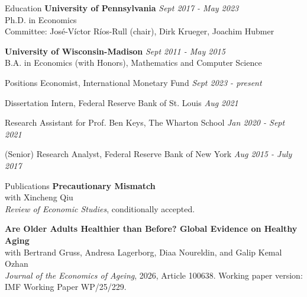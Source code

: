 \documentclass{resume}
\begin{document}
\begin{rSection}{Education}
{\bf University of Pennsylvania} \hfill {\em Sept 2017 - May 2023}
\\Ph.D. in Economics
\\Committee: Jos\'e-V\'ictor R\'ios-Rull (chair), Dirk Krueger, Joachim Hubmer

{\bf University of Wisconsin-Madison} \hfill {\em Sept 2011 - May 2015}
\\B.A. in Economics (with Honors), Mathematics and Computer Science %

\end{rSection}


\begin{rSection}{Positions}
{Economist, International Monetary Fund} \hfill {\em Sept 2023 - present}

{Dissertation Intern, Federal Reserve Bank of St. Louis} \hfill {\em Aug 2021}

{Research Assistant for Prof. Ben Keys, The Wharton School} \hfill {\em Jan 2020 - Sept 2021}

{(Senior) Research Analyst, Federal Reserve Bank of New York} \hfill {\em Aug 2015 - July 2017}
\end{rSection}

\newcommand{\paper}[3]{\textbf{#1}\\ #2 \\ #3 \vspace{3pt}\par}
\newcommand{\paperalone}[2]{\textbf{#1}\\ #2 \vspace{3pt}\par}

\begin{rSection}{Publications}
\paper{Precautionary Mismatch}{with Xincheng Qiu}{\textit{Review of Economic Studies}, conditionally accepted.}

\paper{Are Older Adults Healthier than Before? Global Evidence on Healthy Aging}{with Bertrand Gruss, Andresa Lagerborg, Diaa Noureldin, and Galip Kemal Ozhan}{\textit{Journal of the Economics of Ageing}, 2026, Article 100638. Working paper version: IMF Working Paper WP/25/229.}
\end{rSection}
\end{document}
